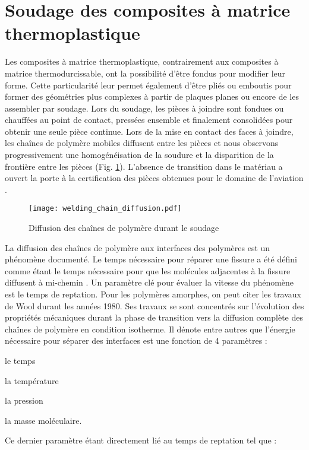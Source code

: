 \section{Soudage des composites à matrice thermoplastique}

Les composites à matrice thermoplastique, contrairement aux composites à matrice thermodurcissable, ont la possibilité d'être fondus pour modifier leur forme. 
Cette particularité leur permet également d'être pliés ou emboutis pour former des géométries plus complexes à partir de plaques planes ou encore de les assembler par soudage. 
Lors du soudage, les pièces à joindre sont fondues ou chauffées au point de contact, pressées ensemble et finalement consolidées pour obtenir une seule pièce continue. 
Lors de la mise en contact des faces à joindre, les chaînes de polymère mobiles diffusent entre les pièces et nous observons progressivement une homogénéisation de la soudure et la disparition de la frontière entre les pièces (Fig. \ref{fig:polymer_diffusion}). 
L'absence de transition dans le matériau a ouvert la porte à la certification des pièces obtenues pour le domaine de l'aviation \cite{Gardiner2018}. 

\begin{figure}[h]
	\centering
	\texttt{[image: welding\_chain\_diffusion.pdf]}
	\caption{Diffusion des chaînes de polymère durant le soudage}
	\label{fig:polymer_diffusion}
\end{figure}

La diffusion des chaînes de polymère aux interfaces des polymères est un phénomène documenté. 
Le temps nécessaire pour réparer une fissure a été défini comme étant le temps nécessaire pour que les molécules adjacentes à la fissure diffusent à mi-chemin \cite{Prager1981a}. 
Un paramètre clé pour évaluer la vitesse du phénomène est le temps de reptation. 
Pour les polymères amorphes, on peut citer les travaux de Wool \cite{Wool1983,Wool1989} durant les années 1980. 
Ses travaux se sont concentrés sur l'évolution des propriétés mécaniques durant la phase de transition vers la diffusion complète des chaînes de polymère en condition isotherme. 
Il dénote entre autres que l'énergie nécessaire pour séparer des interfaces est une fonction de 4 paramètres : \begin{inparaenum}[(1)]
	\item le temps
	\item la température
	\item la pression
	\item la masse moléculaire. 
\end{inparaenum}
Ce dernier paramètre étant directement lié au temps de reptation tel que : 

